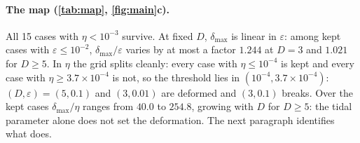 \documentclass[11pt]{article}
\theoremstyle{definition}\newtheorem{definition}[theorem]{Definition}
\theoremstyle{remark}\newtheorem{remark}[theorem]{Remark}
\begin{document}
\paragraph{The map (\cref{tab:map}, \cref{fig:main}c).} All 15 cases with $\eta<10^{-3}$ survive. At fixed $D$, $\delta_{\max}$ is linear in $\varepsilon$: among kept cases with $\varepsilon\le10^{-2}$, $\delta_{\max}/\varepsilon$ varies by at most a factor $1.244$ at $D=3$ and $1.021$ for $D\ge5$. In $\eta$ the grid splits cleanly: every case with $\eta\le10^{-4}$ is kept and every case with $\eta\ge3.7\times10^{-4}$ is not, so the threshold lies in $(10^{-4},3.7\times10^{-4})$: $(D,\varepsilon)=(5,0.1)$ and $(3,0.01)$ are deformed and $(3,0.1)$ breaks. Over the kept cases $\delta_{\max}/\eta$ ranges from $40.0$ to $254.8$, growing with $D$ for $D\ge5$: the tidal parameter alone does not set the deformation. The next paragraph identifies what does.
\end{document}
